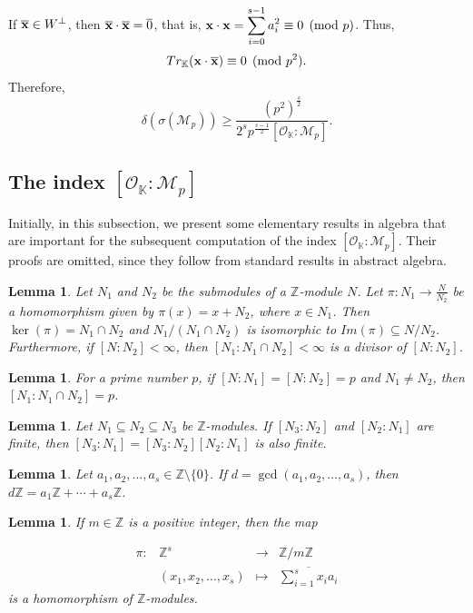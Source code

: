 \documentclass[10pt,a4paper]{amsart}
\newtheorem{lemma}[theorem]{Lemma}
\begin{document}
If $\overline{\bf x}\in W^{\perp}$, then $\overline{\bf x}\cdot\overline{\bf x}=\overline{0}$, that is, $\displaystyle {\bf x}\cdot {\bf x}=\sum_{i=0}^{s-1}a_i^2\equiv 0 \pmod{p}$. Thus, \[ Tr_{\mathbb{K}}({\bf x}\cdot\overline{\bf x})\equiv 0 \pmod{p^2}. \] Therefore, \begin{equation}\label{eq-s-cong1}
    \delta(\sigma(\mathcal{M}_p)) \geq \frac{(p^2)^{\frac{s}{2}}}{2^sp^{\frac{s-1}{2}}[\mathcal{O}_{\mathbb{K}}:\mathcal{M}_p]}. \end{equation}

\subsection{The index $[\mathcal{O}_{\mathbb{K}}:\mathcal{M}_p]$}

Initially, in this subsection, we present some elementary results in algebra that are important for the subsequent computation of the index $[\mathcal{O}_{\mathbb{K}}:\mathcal{M}_p]$. Their proofs are omitted, since they follow from standard results in abstract algebra.

\begin{lemma} \label{lem-2} Let $N_1$ and $N_2$ be the submodules of a $\mathbb{Z}$-module $N$. Let $\pi:N_1\rightarrow \frac{N}{N_2}$ be a homomorphism given by $\pi(x)=x+N_2$, where $x\in N_1$. Then $\ker(\pi) = N_1\cap N_2$ and $N_1/(N_1\cap N_2)$ is isomorphic to $Im(\pi)\subseteq N/N_2$. Furthermore, if $[N:N_2]<\infty$, then $[N_1:N_1\cap N_2]<\infty$ is a divisor of $[N:N_2]$.\end{lemma}

\begin{lemma} \label{cor-2} For a prime number $p$, if $[N:N_1]=[N:N_2]=p$ and $N_1\neq N_2$, then $[N_1:N_1\cap N_2]=p$. \end{lemma} 

\begin{lemma} \label{lem-3} Let $N_1\subseteq N_2\subseteq N_3$ be $\mathbb{Z}$-modules. If $[N_3:N_2]$ and $[N_2:N_1]$ are finite, then $[N_3:N_1]=[N_3:N_2][N_2:N_1]$ is also finite. \end{lemma}

\begin{lemma} \label{lem-4} Let $a_1,a_2,\ldots,a_s\in\mathbb{Z}\setminus\{0\}$. If $d=\gcd(a_1,a_2,\ldots,a_s)$, then $d\mathbb{Z}=a_1\mathbb{Z}+\cdots+a_s\mathbb{Z}$. \end{lemma}

\begin{lemma} \label{cor-3} If $m\in\mathbb{Z}$ is a positive integer, then the map

\[\begin{array}{llll} \pi:&\mathbb{Z}^s&\rightarrow& \mathbb{Z}/m\mathbb{Z}\\
& (x_1,x_2,\ldots,x_s) &\mapsto & \overline{\sum_{i=1}^s x_i a_i}
\end{array} \]
is a homomorphism of $\mathbb{Z}$-modules. \end{lemma}
\end{document}
